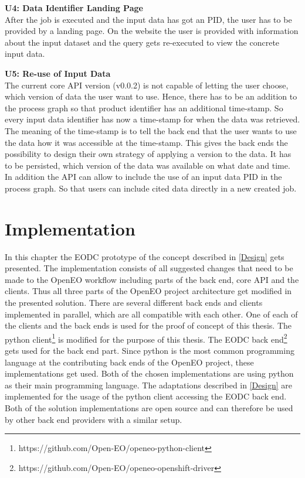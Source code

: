 \documentclass[draft,final]{vutinfth} %
\begin{document}
\textbf{U4: Data Identifier Landing Page} \\
After the job is executed and the input data has got an PID, the user has to be provided by a landing page. On the website the user is provided with information about the input dataset and the query gets re-executed to view the concrete input data.
    
\textbf{U5: Re-use of Input Data} \\
The current core API version (v0.0.2) is not capable of letting the user choose, which version of data the user want to use. Hence, there has to be an addition to the process graph so that product identifier has an additional time-stamp. So every input data identifier has now a time-stamp for when the data was retrieved. The meaning of the time-stamp is to tell the back end that the user wants to use the data how it was accessible at the time-stamp. This gives the back ends the possibility to design their own strategy of applying a version to the data. It has to be persisted, which version of the data was available on what date and time. In addition the API can allow to include the use of an input data PID in the process graph. So that users can include cited data directly in a new created job.  

\chapter{Implementation}\label{Implementation}
In this chapter the EODC prototype of the concept described in \ref{Design} gets presented. The implementation consists of all suggested changes that need to be made to the OpenEO workflow including parts of the back end, core API and the clients. Thus all three parts of the OpenEO project architecture get modified in the presented solution. There are several different back ends and clients implemented in parallel, which are all compatible with each other. One of each of the clients and the back ends is used for the proof of concept of this thesis. The python client\footnote{https://github.com/Open-EO/openeo-python-client} is modified for the purpose of this thesis. The EODC back end\footnote{https://github.com/Open-EO/openeo-openshift-driver} gets used for the back end part. Since python is the most common programming language at the contributing back ends of the OpenEO project, these implementations get used. Both of the chosen implementations are using python as their main programming language. The adaptations described in \ref{Design} are implemented for the usage of the python client accessing the EODC back end. Both of the solution implementations are open source and can therefore be used by other back end providers with a similar setup.  
\end{document}
